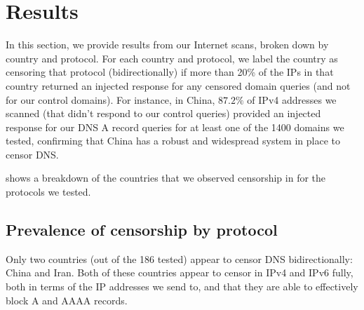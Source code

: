 \section{Results}
\PrevalenceGeneral
\label{sec:prevalence}

In this section, we provide results from our Internet scans, broken down by
country and protocol. For each country and protocol, we label the country as
censoring that protocol (bidirectionally) if more than 20\% of the IPs in that
country returned an injected response for any censored domain queries (and not
for our control domains). For instance, in China, $87.2\%$ of IPv4 addresses we
scanned (that didn't respond to our control queries) provided an injected
response for our DNS A record queries for at least one of the 1400 domains we
tested, confirming that China has a robust and widespread system in place to
censor DNS.

 shows a breakdown of the countries that we observed
censorship in for the protocols we tested.



\subsection{Prevalence of censorship by protocol}
\label{sec:prevalence:proto}



Only two countries (out of the 186 tested) appear to censor DNS bidirectionally:
China and Iran. Both of these countries appear to censor in IPv4 and IPv6 fully,
both in terms of the IP addresses we send to, and that they are able to
effectively block A and AAAA records.

